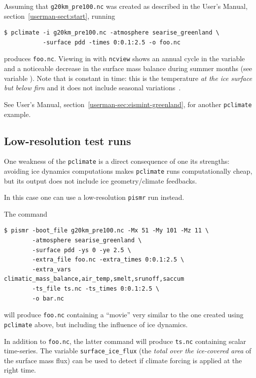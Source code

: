 \documentclass[titlepage,letterpaper,final]{scrartcl}
\begin{document}
Assuming that \texttt{g20km_pre100.nc} was created as described in the User's Manual, section~\ref*{userman-sect:start}, running
\begin{verbatim}
$ pclimate -i g20km_pre100.nc -atmosphere searise_greenland \
           -surface pdd -times 0:0.1:2.5 -o foo.nc
\end{verbatim}%
produces \texttt{foo.nc}. Viewing in with \texttt{ncview} shows an annual cycle in the variable  and a noticeable decrease in the surface mass balance during summer months (see variable ). Note that  is constant in time: this is the temperature \emph{at the ice surface but below firn} and it does not include seasonal variations~\cite{Hock05}.

See User's Manual, section~\ref*{userman-sec:eismint-greenland}, for another \texttt{pclimate} example.

\subsection{Low-resolution test runs}
\label{sec:low-resolution-test-runs}

One weakness of the \texttt{pclimate} is a direct consequence of one its strengths: avoiding ice dynamics computations makes \texttt{pclimate} runs computationally cheap, but its output does not include ice geometry/climate feedbacks.

In this case one can use a low-resolution \texttt{pismr} run instead.

The command
\begin{verbatim}
$ pismr -boot_file g20km_pre100.nc -Mx 51 -My 101 -Mz 11 \
        -atmosphere searise_greenland \
        -surface pdd -ys 0 -ye 2.5 \
        -extra_file foo.nc -extra_times 0:0.1:2.5 \
        -extra_vars climatic_mass_balance,air_temp,smelt,srunoff,saccum
        -ts_file ts.nc -ts_times 0:0.1:2.5 \
        -o bar.nc
\end{verbatim}%
will produce \texttt{foo.nc} containing a ``movie'' very similar to the one created using \texttt{pclimate} above, but including the influence of ice dynamics.

In addition to \texttt{foo.nc}, the latter command will produce \texttt{ts.nc} containing scalar time-series. The variable \texttt{surface_ice_flux} (the \emph{total over the ice-covered area} of the surface mass flux) can be used to detect if climate forcing is applied at the right time.
\end{document}
